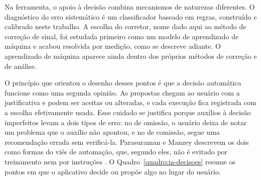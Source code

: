 Na ferramenta, o apoio à decisão combina mecanismos de naturezas diferentes. O diagnóstico do erro sistemático é um classificador baseado em regras, construído e calibrado neste trabalho. A escolha do corretor, nome dado aqui ao método de correção de sinal, foi estudada primeiro como um modelo de aprendizado de máquina e acabou resolvida por medição, como se descreve adiante. O aprendizado de máquina aparece ainda dentro dos próprios métodos de correção e de análise.

O princípio que orientou o desenho desses pontos é que a decisão automática funcione como uma segunda opinião. As propostas chegam ao usuário com a justificativa e podem ser aceitas ou alteradas, e cada execução fica registrada com a escolha efetivamente usada. Esse cuidado se justifica porque auxílios à decisão imperfeitos levam a dois tipos de erro: no de omissão, o usuário deixa de notar um problema que o auxílio não apontou, e no de comissão, segue uma recomendação errada sem verificá-la. Parasuraman e Manzey descrevem os dois como formas do viés de automação, que, segundo eles, não é evitado por treinamento nem por instruções \cite{parasuraman2010complacency}. O Quadro~\ref{quadro:ia-decisoes} resume os pontos em que o aplicativo decide ou propõe algo no lugar do usuário.


